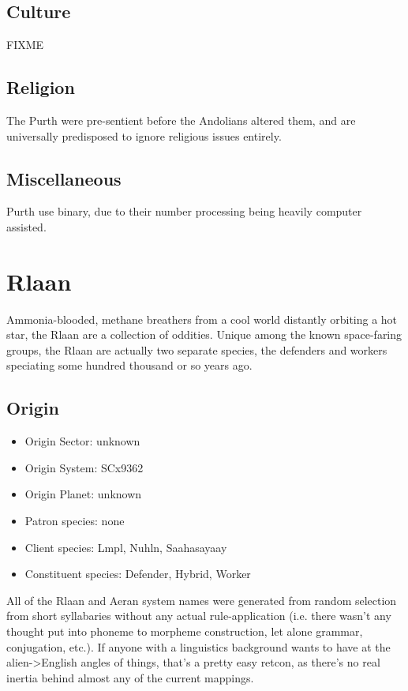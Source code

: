 \subsection{Culture}
FIXME 

\subsection{Religion}
The Purth were pre-sentient before the Andolians altered them, and are
universally predisposed to ignore religious issues entirely.

\subsection{Miscellaneous}
Purth use binary, due to their number processing being heavily
computer assisted.

\section{Rlaan}

Ammonia-blooded, methane breathers from a cool world distantly
orbiting a hot star, the Rlaan are a collection of oddities. Unique
among the known space-faring groups, the Rlaan are actually two
separate species, the defenders and workers speciating some hundred
thousand or so years ago.

\subsection{Origin}
\begin{itemize}
\item Origin Sector: unknown
\item Origin System: SCx9362
\item Origin Planet: unknown
\item Patron species: none
\item Client species: Lmpl, Nuhln, Saahasayaay
\item Constituent species: Defender,  Hybrid, Worker
\end{itemize}

All of the Rlaan and Aeran system names were generated from random selection from short syllabaries without any actual rule-application (i.e. there wasn't any thought put into phoneme to morpheme construction, let alone grammar, conjugation, etc.). If anyone with a linguistics background wants to have at the alien->English angles of things, that's a pretty easy retcon, as there's no real inertia behind almost any of the current mappings.

